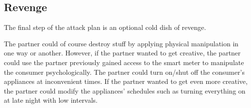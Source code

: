 \subsection{Revenge}
The final step of the attack plan is an optional cold dish of revenge.

The partner could of course destroy stuff by applying physical manipulation in one way or another.
However, if the partner wanted to get creative, the partner could use the partner previously gained access to the smart meter to manipulate the consumer psychologically.
The partner could turn on/shut off the consumer's appliances at inconvenient times.
If the partner wanted to get even more creative, the partner could modify the appliances' schedules such as turning everything on at late night with low intervals.
